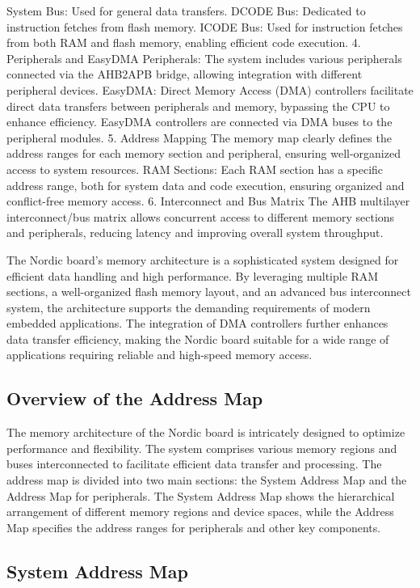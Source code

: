 \documentclass{Configuration_Files/PoliMi3i_thesis}
\begin{document}
System Bus: Used for general data transfers.
DCODE Bus: Dedicated to instruction fetches from flash memory.
ICODE Bus: Used for instruction fetches from both RAM and flash memory, enabling efficient code execution.
4. Peripherals and EasyDMA
Peripherals: The system includes various peripherals connected via the AHB2APB bridge, allowing integration with different peripheral devices.
EasyDMA: Direct Memory Access (DMA) controllers facilitate direct data transfers between peripherals and memory, bypassing the CPU to enhance efficiency. EasyDMA controllers are connected via DMA buses to the peripheral modules.
5. Address Mapping
The memory map clearly defines the address ranges for each memory section and peripheral, ensuring well-organized access to system resources.
RAM Sections: Each RAM section has a specific address range, both for system data and code execution, ensuring organized and conflict-free memory access.
6. Interconnect and Bus Matrix
The AHB multilayer interconnect/bus matrix allows concurrent access to different memory sections and peripherals, reducing latency and improving overall system throughput.

The Nordic board's memory architecture is a sophisticated system designed for efficient data handling and high performance. By leveraging multiple RAM sections, a well-organized flash memory layout, and an advanced bus interconnect system, the architecture supports the demanding requirements of modern embedded applications. The integration of DMA controllers further enhances data transfer efficiency, making the Nordic board suitable for a wide range of applications requiring reliable and high-speed memory access.

\subsection{Overview of the Address Map}
The memory architecture of the Nordic board is intricately designed to optimize performance and flexibility. The system comprises various memory regions and buses interconnected to facilitate efficient data transfer and processing.
The address map is divided into two main sections: the System Address Map and the Address Map for peripherals. The System Address Map shows the hierarchical arrangement of different memory regions and device spaces, while the Address Map specifies the address ranges for peripherals and other key components.

\subsection{System Address Map}
\end{document}
